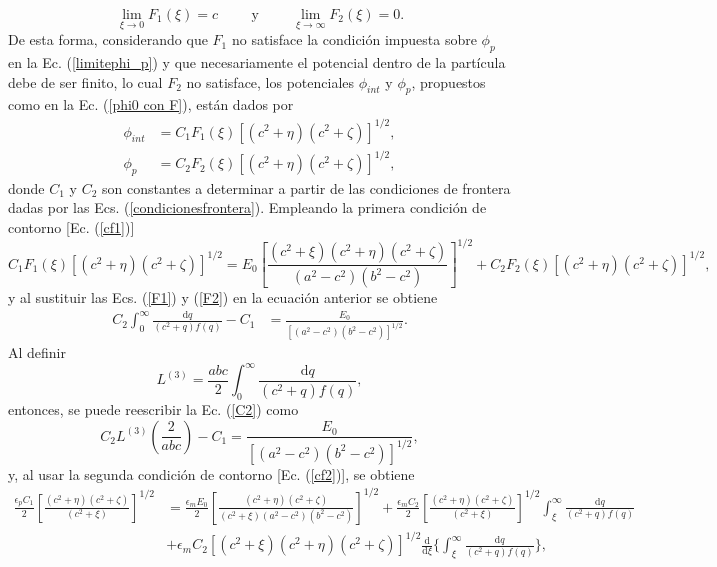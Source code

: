 \begin{equation}
    \lim_{\xi \to 0}F_1(\xi)=c\hspace{1cm}\mbox{y}\hspace{1cm} \lim_{\xi \to \infty}F_2(\xi)=0.
\end{equation}
De esta forma, considerando que $F_1$ no satisface la condición impuesta sobre $\phi_p$ en la Ec. (\ref{limitephi_p}) y que necesariamente el potencial dentro de la partícula debe de ser finito, lo cual $F_2$ no satisface, los potenciales $\phi_{int}$ y $\phi_p$, propuestos como en la Ec. (\ref{phi0 con F}), están dados por
\begin{align}
    \phi_{int}&=C_1F_1(\xi)[(c^2+\eta)(c^2+\zeta)]^{1/2}\label{phi_int},\\
    \phi_p&=C_2F_2(\xi)[(c^2+\eta)(c^2+\zeta)]^{1/2}\label{phi_p},
\end{align}
donde $C_1$ y $C_2$ son constantes a determinar a partir de las condiciones de frontera dadas por las Ecs. (\ref{condicionesfrontera}). Empleando la primera condición de contorno [Ec. (\ref{cf1})]
\begin{equation*}
    C_1F_1(\xi)[(c^2+\eta)(c^2+\zeta)]^{1/2}=E_0\left[\frac{(c^2+\xi)(c^2+\eta)(c^2+\zeta)}{(a^2-c^2)(b^2-c^2)}\right]^{1/2}+C_2F_2(\xi)[(c^2+\eta)(c^2+\zeta)]^{1/2},
\end{equation*}
y al sustituir las Ecs. (\ref{F1}) y (\ref{F2}) en la ecuación anterior se obtiene
\begin{align}
    C_2 \int_{0}^{\infty}\frac{\text{d}q}{(c^2+q)f(q)}-C_1&=\frac{E_0}{[(a^2-c^2)(b^2-c^2)]^{1/2}}.
    \label{C2}
\end{align}
Al definir
\begin{equation}
    L^{(3)}=\frac{abc}{2}\int_{0}^{\infty}\frac{\text{d}q}{(c^2+q)f(q)},
\end{equation}
entonces, se puede reescribir la Ec. (\ref{C2}) como
\begin{equation}
    C_2L^{(3)}\left(\frac{2}{abc}\right)-C_1=\frac{E_0}{[(a^2-c^2)(b^2-c^2)]^{1/2}},
    \label{ec1 de cf}
\end{equation}
y, al usar la segunda condición de contorno [Ec. (\ref{cf2})], se obtiene
\begin{align*}
    \frac{\epsilon_pC_1}{2}\left[\frac{(c^2+\eta)(c^2+\zeta)}{(c^2+\xi)}\right]^{1/2}&=\frac{\epsilon_mE_0}{2}\left[\frac{(c^2+\eta)(c^2+\zeta)}{(c^2+\xi)(a^2-c^2)(b^2-c^2)}\right]^{1/2}+\frac{\epsilon_m C_2}{2}\left[\frac{(c^2+\eta)(c^2+\zeta)}{(c^2+\xi)}\right]^{1/2}\int_{\xi}^{\infty}\frac{\text{d}q}{(c^2+q)f(q)}\\
   &+\epsilon_mC_2[(c^2+\xi)(c^2+\eta)(c^2+\zeta)]^{1/2}\frac{\text{d}}{\text{d}\xi}\Bigg\{\int_{\xi}^{\infty}\frac{\text{d}q}{(c^2+q)f(q)}\Bigg\},
\end{align*}
